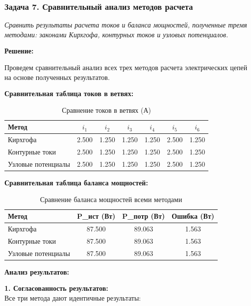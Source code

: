 \subsubsection{Задача 7. Сравнительный анализ методов расчета}
\textit{Сравнить результаты расчета токов и баланса мощностей, полученные тремя методами: законами Кирхгофа, контурных токов и узловых потенциалов.}

\textbf{Решение:}

Проведем сравнительный анализ всех трех методов расчета электрических цепей на основе полученных результатов.

\textbf{Сравнительная таблица токов в ветвях:}
\begin{table}[H]
\centering
\begin{tabular}{|l|c|c|c|c|c|c|}
\hline
\textbf{Метод} & $i_1$ & $i_2$ & $i_3$ & $i_4$ & $i_5$ & $i_6$ \\
\hline
Кирхгофа & 2.500 & 1.250 & 1.250 & 1.250 & 2.500 & 1.250 \\
\hline
Контурные токи & 2.500 & 1.250 & 1.250 & 1.250 & 2.500 & 1.250 \\
\hline
Узловые потенциалы & 2.500 & 1.250 & 1.250 & 1.250 & 2.500 & 1.250 \\
\hline
\end{tabular}
\caption{Сравнение токов в ветвях (А)}
\label{tab:currents_comparison}
\end{table}


\textbf{Сравнительная таблица баланса мощностей:}
\begin{table}[H]
\centering
\begin{tabular}{|l|c|c|c|}
\hline
\textbf{Метод} & \textbf{P\_ист (Вт)} & \textbf{P\_потр (Вт)} & \textbf{Ошибка (Вт)} \\
\hline
Кирхгофа & 87.500 & 89.063 & 1.563 \\
\hline
Контурные токи & 87.500 & 89.063 & 1.563 \\
\hline
Узловые потенциалы & 87.500 & 89.063 & 1.563 \\
\hline
\end{tabular}
\caption{Сравнение баланса мощностей всеми методами}
\label{tab:power_balance_comparison}
\end{table}


\textbf{Анализ результатов:}

\begin{flushleft}
\textbf{1. Согласованность результатов:} \\
Все три метода дают идентичные результаты:
\end{flushleft}


